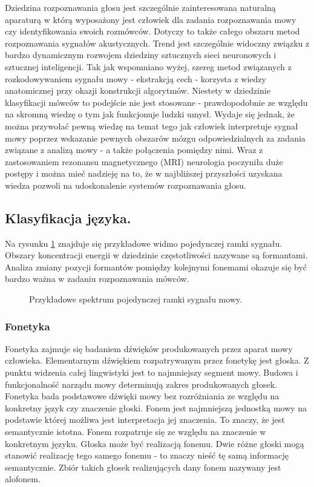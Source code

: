 Dziedzina rozpoznawania głosu jest szczególnie zainteresowana naturalną aparaturą w którą wyposażony jest człowiek dla zadania rozpoznawania mowy czy identyfikowania swoich rozmówców. Dotyczy to także całego obszaru metod rozpoznawania sygnałów akustycznych. Trend jest szczególnie widoczny związku z bardzo dynamicznym rozwojem dziedziny sztucznych sieci neuronowych i sztucznej inteligencji. Tak jak wspomniano wyżej, szereg metod związanych z rozkodowywaniem sygnału mowy - ekstrakcją cech - korzysta z wiedzy anatomicznej przy okazji konstrukcji algorytmów. Niestety w dziedzinie klasyfikacji mówców to podejście nie jest stosowane - prawdopodobnie ze względu na skromną wiedzę o tym jak funkcjonuje ludzki umysł. Wydaje się jednak, że można przywołać pewną wiedzę na temat tego jak człowiek interpretuje sygnał mowy poprzez wskazanie pewnych obszarów mózgu odpowiedzialnych za zadania związane z analizą mowy - a także połączenia pomiędzy nimi. Wraz z zastosowaniem rezonansu magnetycznego (MRI) neurologia poczyniła duże postępy i można mieć nadzieję na to, że w najbliższej przyszłości uzyskana wiedza pozwoli na udoskonalenie systemów rozpoznawania głosu.

\subsection{Klasyfikacja języka.}
\label{formant}
Na rysunku \ref{fig:spectrum} znajduje się przykładowe widmo pojedynczej ramki sygnału. Obszary koncentracji energii w dziedzinie częstotliwości nazywane są formantami. Analiza zmiany pozycji formantów pomiędzy kolejnymi fonemami okazuje się być bardzo ważna w zadaniu rozpoznawania mówców. 

\begin{figure}[ht!]
  \centering
    
    \caption{\label{fig:spectrum} Przykładowe spektrum pojedynczej ramki sygnału mowy.}
\end{figure}

\subsubsection{Fonetyka}
Fonetyka zajmuje się badaniem dźwięków produkowanych przez aparat mowy człowieka. Elementarnym dźwiękiem rozpatrywanym przez fonetykę jest głoska. Z punktu widzenia całej lingwistyki jest to najmniejszy segment mowy. Budowa i funkcjonalność narządu mowy determinują zakres produkowanych głosek. Fonetyka bada podstawowe dźwięki mowy bez rozróżniania ze względu na konkretny język czy znaczenie głoski.
Fonem jest najmniejszą jednostką mowy na podstawie której możliwa jest interpretacja jej znaczenia. To znaczy, że jest semantycznie istotna. Fonem rozpatruje się ze względu na znaczenie w konkretnym języku. Głoska może być realizacją fonemu. Dwie różne głoski mogą stanowić realizację tego samego fonemu - to znaczy nieść tę samą informację semantycznie. Zbiór takich głosek realizujących dany fonem nazywany jest alofonem.

